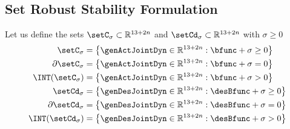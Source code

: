 \subsection{Set Robust  Stability Formulation}	\label{subsec-chap3:Robust constraint formulation}
Let us define the sets $\setC_\sigma\subset\mathbb{R}^{13+2n}$ and $\setCd_{\sigma}\subset\mathbb{R}^{13+2n}$ with $\sigma\geq0$
\begin{align}
	\label{eq:act C_sigma}\setC_\sigma &=\left\{\genActJointDyn\in \mathbb{R}^{13+2n}:\bfunc+ \sigma\geq0\right\} \\
	\label{eq:border act C_sigma}\partial\setC_\sigma &=\left\{\genActJointDyn\in \mathbb{R}^{13+2n}:\bfunc+\sigma=0\right\} \\
	\label{eq:int act C_sigma}\INT(\setC_\sigma) &=\left\{\genActJointDyn\in \mathbb{R}^{13+2n}:\bfunc+\sigma>0\right\}\\
	\label{eq:des C_sigma}\setCd_{\sigma} &=\left\{\genDesJointDyn\in \mathbb{R}^{13+2n}:\desBfunc+ \sigma\geq0\right\}\\
	\label{eq:border des C_sigma}\partial\setCd_{\sigma} &=\left\{\genDesJointDyn\in \mathbb{R}^{13+2n}:\desBfunc+\sigma=0\right\}\\
	\label{eq:int set C_sigma}\INT(\setCd_{\sigma}) &=\left\{\genDesJointDyn\in \mathbb{R}^{13+2n}:\desBfunc+\sigma>0\right\}
\end{align}

